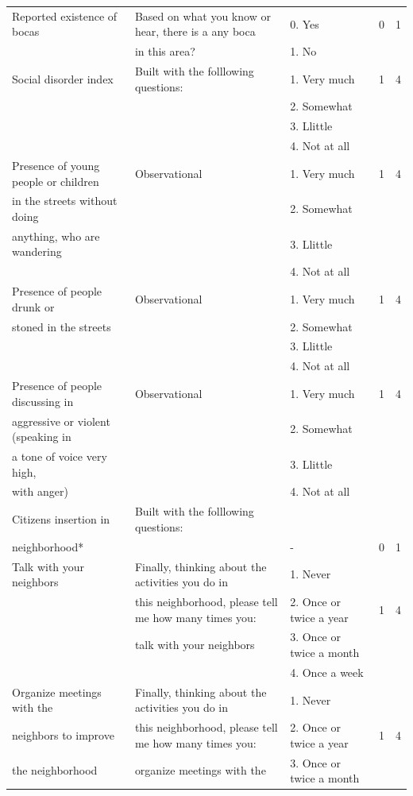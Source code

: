 \documentclass[11pt]{article}
\begin{document}
\begin{tiny}
\begin{tabular}{lllcc}
Reported existence of bocas	&	Based on what you know or hear, there is a any boca	&	0. Yes	&	0	&	1	\\
	&	in this area?	&	1. No 	&		&		\\\hline
Social disorder index	&	Built with the folllowing questions:	&	1. Very much	&	1	&	4	\\
	&		&	2. Somewhat	&		&		\\
	&		&	3. Llittle	&		&		\\
	&		&	4. Not at all	&		&		\\
Presence of young people or children 	&	Observational	&	1. Very much	&	1	&	4	\\
in the streets without doing	&		&	2. Somewhat	&		&		\\
 anything, who are wandering	&		&	3. Llittle	&		&		\\
	&		&	4. Not at all	&		&		\\
Presence of   people drunk or 	&	Observational	&	1. Very much	&	1	&	4	\\
stoned in the streets	&		&	2. Somewhat	&		&		\\
	&		&	3. Llittle	&		&		\\
	&		&	4. Not at all	&		&		\\
Presence of people discussing in 	&	Observational	&	1. Very much	&	1	&	4	\\
aggressive or violent (speaking in 	&		&	2. Somewhat	&		&		\\
a tone of voice very high, 	&		&	3. Llittle	&		&		\\
with anger)	&		&	4. Not at all	&		&		\\\hline
Citizens insertion in 	&	Built with the folllowing questions:	&		&		&		\\
neighborhood*	&		&	-	&	0	&	1	\\
Talk with your neighbors	&	Finally, thinking about the activities you do in 	&	1. Never	&		&		\\
	&	this neighborhood, please tell me how many times you:	&	2. Once or twice a year	&	1	&	4	\\
	&	talk with your neighbors	&	3. Once or twice a month	&		&		\\
	&		&	4. Once a week	&		&		\\
Organize meetings with the 	&	Finally, thinking about the activities you do in 	&	1. Never	&		&		\\
neighbors to improve 	&	this neighborhood, please tell me how many times you:	&	2. Once or twice a year	&	1	&	4	\\
the neighborhood	&	organize meetings with the 	&	3. Once or twice a month	&		&		\\

\end{tabular}
\end{tiny}
\end{document}
